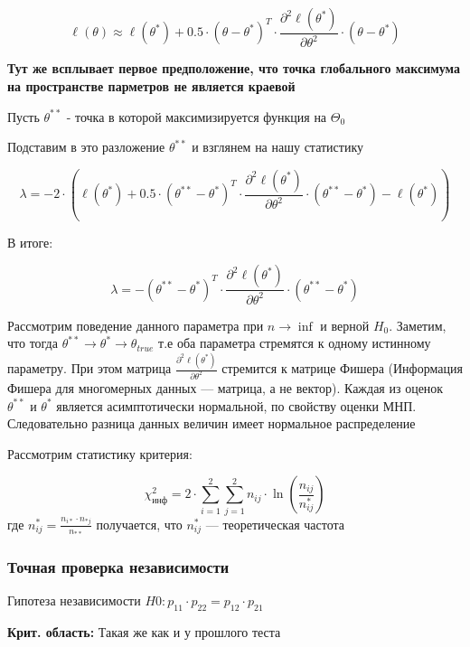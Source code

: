 \documentclass{article}
\begin{document}
    \quad

    \begin{equation}
        \ell(\theta) \approx \ell(\theta^{*}) +
        0.5 \cdot (\theta - \theta^{*})^{T} \cdot \frac{\partial^{2} \ell(\theta^{*})}{\partial \theta^{2}} \cdot (\theta - \theta^{*})
    \end{equation}

    \quad

    \textbf{Тут же всплывает первое предположение, что точка глобального максимума на пространстве парметров не является краевой}

    \quad

    Пусть $\theta^{**}$ - точка в которой максимизируется функция на $\Theta_{0}$

    Подставим в это разложение $\theta^{**}$ и взглянем на нашу статистику

    \begin{equation}
        \lambda = -2 \cdot (\ell(\theta^{*}) +
        0.5 \cdot (\theta^{**} - \theta^{*})^{T} \cdot \frac{\partial^{2} \ell(\theta^{*})}{\partial \theta^{2}} \cdot (\theta^{**} - \theta^{*}) - \ell(\theta^{*}))
    \end{equation}

    \quad

    В итоге:

    \quad

    \begin{equation}
         \lambda = -(\theta^{**} - \theta^{*})^{T} \cdot \frac{\partial^{2} \ell(\theta^{*})}{\partial \theta^{2}} \cdot (\theta^{**} - \theta^{*})
    \end{equation}

    Рассмотрим поведение данного параметра при $n \rightarrow \inf$ и верной $H_{0}$.
    Заметим, что тогда $\theta^{**} \rightarrow \theta^{*} \rightarrow \theta_{true}$ т.е оба параметра стремятся к одному истинному параметру.
    При этом матрица $\frac{\partial^{2} \ell(\theta^{*})}{\partial \theta^{2}}$  стремится к матрице Фишера (Информация Фишера для многомерных данных --- матрица, а не вектор).
    Каждая из оценок $\theta^{**}$ и $\theta^{*}$ является асимптотически нормальной, по свойству оценки МНП.
    Следовательно разница данных величин имеет нормальное распределение



    Рассмотрим статистику критерия:

    \begin{equation}
        \chi^{2}_{\text{инф}} = 2 \cdot \sum_{i=1}^{2} {\sum_{j=1}^{2} {n_{ij} \cdot \ln(\frac{n_{ij}}{n_{ij}^{*}}) } }
    \end{equation}
    где $n_{ij}^{*} = \frac{n_{i*} \cdot n_{*j}}{n_{**}}$ получается, что $n_{ij}^{*}$ --- теоретическая частота

    
    \subsubsection{Точная проверка независимости}

    Гипотеза независимости $H0: p_{11} \cdot p_{22} = p_{12} \cdot p_{21}$

    \textbf{Крит. область:} Такая же как и у прошлого теста
\end{document}
